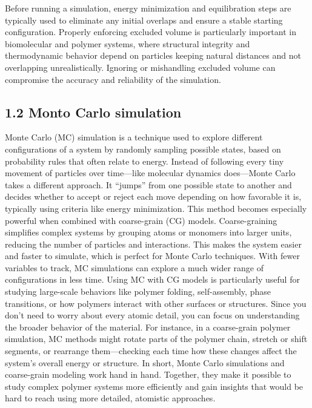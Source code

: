\documentclass[12pt]{article}
\begin{document}
\begin{flushleft}
Before running a simulation, energy minimization and equilibration steps are typically used to eliminate any initial overlaps and ensure a stable starting configuration. Properly enforcing excluded volume is particularly important in biomolecular and polymer systems, where structural integrity and thermodynamic behavior depend on particles keeping natural distances and not overlapping unrealistically. Ignoring or mishandling excluded volume can compromise the accuracy and reliability of the simulation.





\subsection*{1.2 Monto Carlo simulation}

Monte Carlo (MC) simulation is a technique used to explore different configurations of a system by randomly sampling possible states, based on probability rules that often relate to energy. Instead of following every tiny movement of particles over time—like molecular dynamics does—Monte Carlo takes a different approach. It “jumps” from one possible state to another and decides whether to accept or reject each move depending on how favorable it is, typically using criteria like energy minimization.
This method becomes especially powerful when combined with coarse-grain (CG) models. Coarse-graining simplifies complex systems by grouping atoms or monomers into larger units, reducing the number of particles and interactions. This makes the system easier and faster to simulate, which is perfect for Monte Carlo techniques. With fewer variables to track, MC simulations can explore a much wider range of configurations in less time.
Using MC with CG models is particularly useful for studying large-scale behaviors like polymer folding, self-assembly, phase transitions, or how polymers interact with other surfaces or structures. Since you don’t need to worry about every atomic detail, you can focus on understanding the broader behavior of the material. For instance, in a coarse-grain polymer simulation, MC methods might rotate parts of the polymer chain, stretch or shift segments, or rearrange them—checking each time how these changes affect the system’s overall energy or structure.
In short, Monte Carlo simulations and coarse-grain modeling work hand in hand. Together, they make it possible to study complex polymer systems more efficiently and gain insights that would be hard to reach using more detailed, atomistic approaches.


\end{flushleft}
\end{document}
